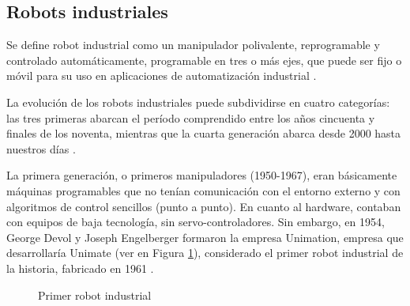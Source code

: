 \subsection{Robots industriales}
\label{sec:robots_industriales}

Se define robot industrial como un manipulador polivalente, reprogramable y controlado automáticamente, programable en tres o más ejes, que puede ser fijo o móvil para su uso en aplicaciones de automatización industrial \cite{ISO8373}.

\pagebreak
La evolución de los robots industriales puede subdividirse en cuatro categorías: las tres primeras abarcan el período comprendido entre los años cincuenta y finales de los noventa, mientras que la cuarta generación abarca desde 2000 hasta nuestros días \cite{Gasparetto19}.

La primera generación, o primeros manipuladores (1950-1967), eran básicamente máquinas programables que no tenían comunicación con el entorno externo y con algoritmos de control sencillos (punto a punto). En cuanto al hardware, contaban con equipos de baja tecnología, sin servo-controladores. Sin embargo, en 1954, George Devol y Joseph Engelberger formaron la empresa Unimation, empresa que desarrollaría Unimate (ver en Figura \ref{fig:primer_robot_industrial}), considerado el primer robot industrial de la historia, fabricado en 1961 \cite{Zamalloa17}.
  
  \begin{figure}[H]
    \begin{center}
      \subcapcentertrue
      \hspace{2mm}
    \end{center}
    \caption{Primer robot industrial}
    \label{fig:primer_robot_industrial}
  \end{figure}
  
